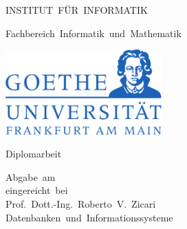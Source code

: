 \begin{titlepage}
\begin{center}

\vspace{6cm}

{\huge INSTITUT~FÜR~INFORMATIK}

\vspace{0.2cm}

{\Large Fachbereich~Informatik~und~Mathematik}

\vspace{2cm}
    \includegraphics[width=6cm]{title/goethe}
\vspace{2.5cm}


{\Large Diplomarbeit}

\vspace{2.5cm}

{\huge \Title }

\vspace{2.5cm}


{\Large \Author}


\vspace{0.5cm}

  \small Abgabe~am~\Date\\
\vspace{3.4cm}
  \small eingereicht~bei\\\large Prof.~Dott.-Ing.~Roberto~V.~Zicari\\\small Datenbanken~und~Informationssysteme
\end{center}

\end{titlepage}

\cleardoublepage
\large


\cleardoublepage


\cleardoublepage

%

\normalsize

\tableofcontents
